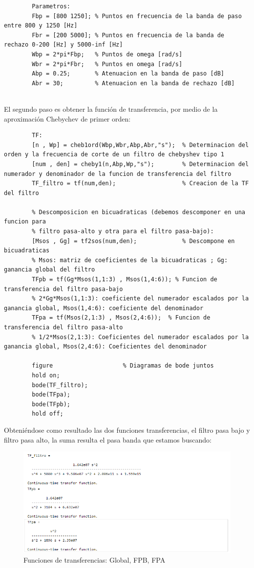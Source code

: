 \documentclass[12pt]{article}
\begin{document}
	\begin{lstlisting}
		Parametros:
		Fbp = [800 1250]; % Puntos en frecuencia de la banda de paso entre 800 y 1250 [Hz]
		Fbr = [200 5000]; % Puntos en frecuencia de la banda de rechazo 0-200 [Hz] y 5000-inf [Hz]
		Wbp = 2*pi*Fbp;   % Puntos de omega [rad/s]
		Wbr = 2*pi*Fbr;   % Puntos en omega [rad/s]
		Abp = 0.25;       % Atenuacion en la banda de paso [dB]
		Abr = 30;         % Atenuacion en la banda de rechazo [dB]
		
	\end{lstlisting}
	
	El segundo paso es obtener la función de transferencia, por medio de la aproximación Chebychev  de primer orden:
	\begin{lstlisting}
		TF:
		[n , Wp] = cheb1ord(Wbp,Wbr,Abp,Abr,"s");  % Determinacion del orden y la frecuencia de corte de un filtro de chebyshev tipo 1
		[num , den] = cheby1(n,Abp,Wp,"s");        % Determinacion del numerador y denominador de la funcion de transferencia del filtro
		TF_filtro = tf(num,den);                   % Creacion de la TF del filtro
		
		% Descomposicion en bicuadraticas (debemos descomponer en una funcion para
		% filtro pasa-alto y otra para el filtro pasa-bajo):
		[Msos , Gg] = tf2sos(num,den);             % Descompone en bicuadraticas
		% Msos: matriz de coeficientes de la bicuadraticas ; Gg: ganancia global del filtro
		TFpb = tf(Gg*Msos(1,1:3) , Msos(1,4:6)); % Funcion de transferencia del filtro pasa-bajo
		% 2*Gg*Msos(1,1:3): coeficiente del numerador escalados por la ganancia global, Msos(1,4:6): coeficiente del denominador
		TFpa = tf(Msos(2,1:3) , Msos(2,4:6));  % Funcion de transferencia del filtro pasa-alto
		% 1/2*Msos(2,1:3): Coeficientes del numerador escalados por la ganancia global, Msos(2,4:6): Coeficientes del denominador
		
		figure                    % Diagramas de bode juntos
		hold on;
		bode(TF_filtro);
		bode(TFpa);
		bode(TFpb);
		hold off;
	\end{lstlisting}
	 
	 Obteniéndose como resultado las dos funciones transferencias, el filtro pasa bajo y filtro pasa alto, la suma resulta el pasa banda que estamos buscando:
	 
	\begin{figure}[h!]
		\includegraphics[width=1\linewidth]{"Simulaciones_Imagenes/funciones de transferencias"}
		\caption[Funciones de transferencias: Global, FPB, FPA]{Funciones de transferencias: Global, FPB, FPA}
		\label{fig:funciones-de-transferencias}
	\end{figure}
	
\end{document}
